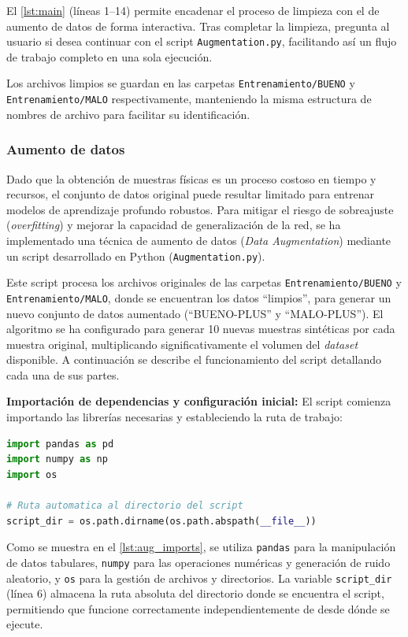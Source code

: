 El \autoref{lst:main} (líneas 1--14) permite encadenar el proceso de limpieza con el de aumento de datos de forma interactiva. Tras completar la limpieza, pregunta al usuario si desea continuar con el script \texttt{Augmentation.py}, facilitando así un flujo de trabajo completo en una sola ejecución.
\par

Los archivos limpios se guardan en las carpetas \texttt{Entrenamiento/BUENO} y \texttt{Entrenamiento/MALO} respectivamente, manteniendo la misma estructura de nombres de archivo para facilitar su identificación.

\subsubsection{Aumento de datos}
Dado que la obtención de muestras físicas es un proceso costoso en tiempo y recursos, el conjunto de datos original puede resultar limitado para entrenar modelos de aprendizaje profundo robustos. Para mitigar el riesgo de sobreajuste (\textit{overfitting}) y mejorar la capacidad de generalización de la red, se ha implementado una técnica de aumento de datos (\textit{Data Augmentation}) mediante un script desarrollado en Python (\texttt{Augmentation.py}).
\par

Este script procesa los archivos originales de las carpetas \texttt{Entrenamiento/BUENO} y \texttt{Entrenamiento/MALO}, donde se encuentran los datos ``limpios'', para generar un nuevo conjunto de datos aumentado (``BUENO-PLUS'' y ``MALO-PLUS''). El algoritmo se ha configurado para generar 10 nuevas muestras sintéticas por cada muestra original, multiplicando significativamente el volumen del \textit{dataset} disponible. A continuación se describe el funcionamiento del script detallando cada una de sus partes.

\textbf{Importación de dependencias y configuración inicial:} El script comienza importando las librerías necesarias y estableciendo la ruta de trabajo:

\begin{lstlisting}[language=Python, caption={Importación de dependencias del script Augmentation.py.}, label={lst:aug_imports}]
import pandas as pd
import numpy as np
import os

# Ruta automatica al directorio del script
script_dir = os.path.dirname(os.path.abspath(__file__))
\end{lstlisting}

Como se muestra en el \autoref{lst:aug_imports}, se utiliza \texttt{pandas} para la manipulación de datos tabulares, \texttt{numpy} para las operaciones numéricas y generación de ruido aleatorio, y \texttt{os} para la gestión de archivos y directorios. La variable \texttt{script\_dir} (línea 6) almacena la ruta absoluta del directorio donde se encuentra el script, permitiendo que funcione correctamente independientemente de desde dónde se ejecute.

